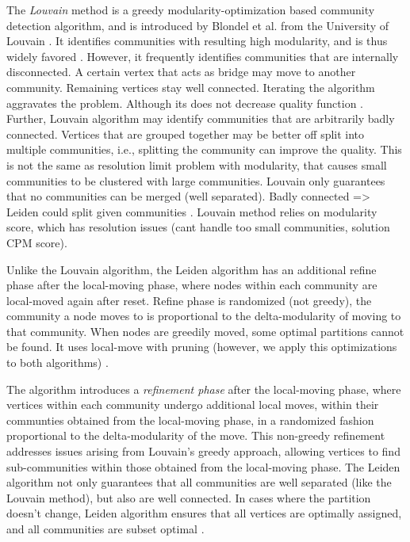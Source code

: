 The \textit{Louvain} method is a greedy modularity-optimization based community detection algorithm, and is introduced by Blondel et al. from the University of Louvain \cite{com-blondel08}. It identifies communities with resulting high modularity, and is thus widely favored \cite{com-lancichinetti09}. However, it frequently identifies communities that are internally disconnected. A certain vertex that acts as bridge may move to another community. Remaining vertices stay well connected. Iterating the algorithm aggravates the problem. Although its does not decrease quality function \cite{com-traag19}. Further, Louvain algorithm may identify communities that are arbitrarily badly connected. Vertices that are grouped together may be better off split into multiple communities, i.e., splitting the community can improve the quality. This is not the same as resolution limit problem with modularity, that causes small communities to be clustered with large communities. Louvain only guarantees that no communities can be merged (well separated). Badly connected => Leiden could split given communities \cite{com-traag19}. Louvain method relies on modularity score, which has resolution issues (cant handle too small communities, solution CPM score).

Unlike the Louvain algorithm, the Leiden algorithm has an additional refine phase after the local-moving phase, where nodes within each community are local-moved again after reset. Refine phase is randomized (not greedy), the community a node moves to is proportional to the delta-modularity of moving to that community. When nodes are greedily moved, some optimal partitions cannot be found. It uses local-move with pruning (however, we apply this optimizations to both algorithms) \cite{com-traag19}.

The algorithm introduces a \textit{refinement phase} after the local-moving phase, where vertices within each community undergo additional local moves, within their communties obtained from the local-moving phase, in a randomized fashion proportional to the delta-modularity of the move. This non-greedy refinement addresses issues arising from Louvain's greedy approach, allowing vertices to find sub-communities within those obtained from the local-moving phase. The Leiden algorithm not only guarantees that all communities are well separated (like the Louvain method), but also are well connected. In cases where the partition doesn't change, Leiden algorithm ensures that all vertices are optimally assigned, and all communities are subset optimal \cite{com-traag19}.

